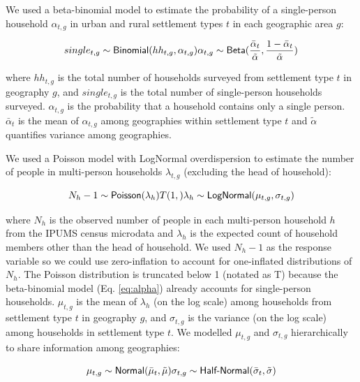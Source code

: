 \documentclass[]{book}
\begin{document}
We used a beta-binomial model to estimate the probability of a
single-person household \(\alpha_{t,g}\) in urban and rural settlement
types \(t\) in each geographic area \(g\):

\begin{equation}
single_{t,g} \sim \textsf{Binomial}(hh_{t,g}, \alpha_{t,g}) \\
\alpha_{t,g} \sim \textsf{Beta}(\frac{\bar{\alpha}_{t}}{\tilde{\alpha}}, \frac{1-\bar{\alpha}_{t}}{\tilde{\alpha}})
\label{eq:alpha}
\end{equation}

where \(hh_{t,g}\) is the total number of households surveyed from
settlement type \(t\) in geography \(g\), and \(single_{t,g}\) is the
total number of single-person households surveyed. \(\alpha_{t,g}\) is
the probability that a household contains only a single person.
\(\bar{\alpha}_{t}\) is the mean of \(\alpha_{t,g}\) among geographies
within settlement type \(t\) and \(\tilde{\alpha}\) quantifies variance
among geographies.

We used a Poisson model with LogNormal overdispersion to estimate the
number of people in multi-person households \(\lambda_{t,g}\) (excluding
the head of household):

\begin{equation}
N_h-1 \sim \textsf{Poisson}(\lambda_{h}) T(1,) \\
\lambda_{h} \sim \textsf{LogNormal}(\mu_{t,g}, \sigma_{t,g})
\label{eq:lambda}
\end{equation}

where \(N_h\) is the observed number of people in each multi-person
household \(h\) from the IPUMS census microdata and \(\lambda_{h}\) is
the expected count of household members other than the head of
household. We used \(N_h - 1\) as the response variable so we could use
zero-inflation to account for one-inflated distributions of \(N_h\). The
Poisson distribution is truncated below 1 (notated as T) because the
beta-binomial model (Eq. \eqref{eq:alpha}) already accounts for
single-person households. \(\mu_{t,g}\) is the mean of \(\lambda_h\) (on
the log scale) among households from settlement type \(t\) in geography
\(g\), and \(\sigma_{t,g}\) is the variance (on the log scale) among
households in settlement type \(t\). We modelled \(\mu_{t,g}\) and
\(\sigma_{t,g}\) hierarchically to share information among geographies:

\begin{equation}
\mu_{t,g} \sim \textsf{Normal}(\bar{\mu}_t, \tilde{\mu}) \\
\sigma_{t,g} \sim \textsf{Half-Normal}(\bar{\sigma}_t, \tilde{\sigma})
\label{eq:mu}
\end{equation}
\end{document}
